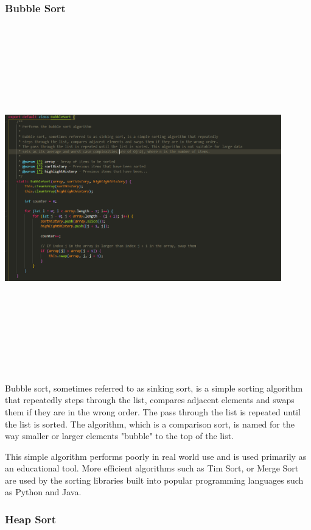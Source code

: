 \subsubsection{Bubble Sort}
\begin{center}
    \includegraphics[width=12cm,height=15cm,keepaspectratio]{images/bubblesort}
\end{center}
Bubble sort, sometimes referred to as sinking sort, is a simple sorting algorithm that repeatedly steps through the list, compares adjacent elements and swaps them if they are in the wrong order. The pass through the list is repeated until the list is sorted. The algorithm, which is a comparison sort, is named for the way smaller or larger elements "bubble" to the top of the list.
\par
\bigskip
This simple algorithm performs poorly in real world use and is used primarily as an educational tool. More efficient algorithms such as Tim Sort, or Merge Sort are used by the sorting libraries built into popular programming languages such as Python and Java.

\subsubsection{Heap Sort}

